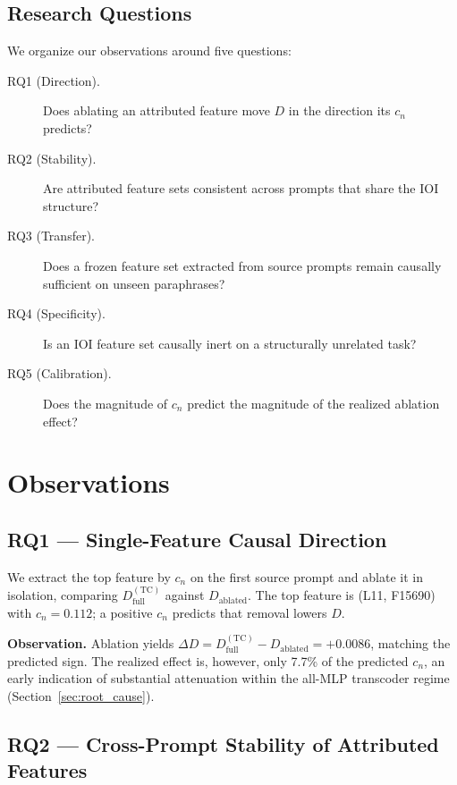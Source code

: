 \documentclass{article}
\begin{document}
\subsection{Research Questions}
\label{sec:rqs}

We organize our observations around five questions:
\begin{description}
  \item[RQ1 (Direction).] Does ablating an attributed feature move $D$ in the
    direction its $c_n$ predicts?
  \item[RQ2 (Stability).] Are attributed feature sets consistent across prompts
    that share the IOI structure?
  \item[RQ3 (Transfer).] Does a frozen feature set extracted from source
    prompts remain causally sufficient on unseen paraphrases?
  \item[RQ4 (Specificity).] Is an IOI feature set causally inert on a
    structurally unrelated task?
  \item[RQ5 (Calibration).] Does the magnitude of $c_n$ predict the magnitude
    of the realized ablation effect?
\end{description}

\section{Observations}

\subsection{RQ1 --- Single-Feature Causal Direction}

We extract the top feature by $c_n$ on the first source prompt and ablate it in
isolation, comparing $D_\text{full}^{(\text{TC})}$ against $D_\text{ablated}$.
The top feature is (L11, F15690) with $c_n = 0.112$; a positive $c_n$ predicts
that removal lowers $D$.

\textbf{Observation.} Ablation yields $\Delta D = D_\text{full}^{(\text{TC})} -
D_\text{ablated} = +0.0086$, matching the predicted sign. The realized effect
is, however, only 7.7\% of the predicted $c_n$, an early indication of
substantial attenuation within the all-MLP transcoder regime
(Section~\ref{sec:root_cause}).

\subsection{RQ2 --- Cross-Prompt Stability of Attributed Features}
\end{document}
